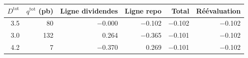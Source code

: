 {\small\begin{tabular}{rrrrrr}
\toprule
$D^{\mathrm{tot}}$ & $q^{\mathrm{tot}}$ (pb) & Ligne dividendes & Ligne repo & Total & Réévaluation \\
\midrule
\num{3.5} & \num{80} & \num{-0.000} & \num{-0.102} & \num{-0.102} & \num{-0.102} \\
\num{3.0} & \num{132} & \num{0.264} & \num{-0.365} & \num{-0.101} & \num{-0.102} \\
\num{4.2} & \num{7} & \num{-0.370} & \num{0.269} & \num{-0.101} & \num{-0.102} \\
\bottomrule
\end{tabular}}
